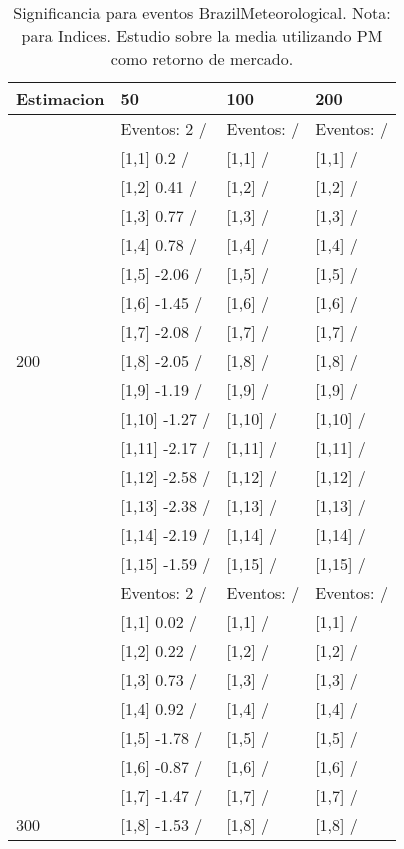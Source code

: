 \begin{table}

\caption{Significancia para eventos BrazilMeteorological. Nota: para Indices. Estudio sobre la media utilizando PM como retorno de mercado.}
\centering
\begin{tabular}[t]{llll}
\toprule
Estimacion & 50 & 100 & 200\\
\midrule
 & Eventos:  2 / & Eventos:   / & Eventos:   /\\
 & {}[1,1] 0.2  / & {}[1,1]  / & {}[1,1]  /\\
 & {}[1,2] 0.41  / & {}[1,2]  / & {}[1,2]  /\\
 & {}[1,3] 0.77  / & {}[1,3]  / & {}[1,3]  /\\
 & {}[1,4] 0.78  / & {}[1,4]  / & {}[1,4]  /\\
\addlinespace
 & {}[1,5] -2.06  / & {}[1,5]  / & {}[1,5]  /\\
 & {}[1,6] -1.45  / & {}[1,6]  / & {}[1,6]  /\\
 & {}[1,7] -2.08  / & {}[1,7]  / & {}[1,7]  /\\
200 & {}[1,8] -2.05  / & {}[1,8]  / & {}[1,8]  /\\
 & {}[1,9] -1.19  / & {}[1,9]  / & {}[1,9]  /\\
\addlinespace
 & {}[1,10] -1.27  / & {}[1,10]  / & {}[1,10]  /\\
 & {}[1,11] -2.17  / & {}[1,11]  / & {}[1,11]  /\\
 & {}[1,12] -2.58  / & {}[1,12]  / & {}[1,12]  /\\
 & {}[1,13] -2.38  / & {}[1,13]  / & {}[1,13]  /\\
 & {}[1,14] -2.19  / & {}[1,14]  / & {}[1,14]  /\\
\addlinespace
 & {}[1,15] -1.59  / & {}[1,15]  / & {}[1,15]  /\\
 & Eventos:  2 / & Eventos:   / & Eventos:   /\\
 & {}[1,1] 0.02  / & {}[1,1]  / & {}[1,1]  /\\
 & {}[1,2] 0.22  / & {}[1,2]  / & {}[1,2]  /\\
 & {}[1,3] 0.73  / & {}[1,3]  / & {}[1,3]  /\\
\addlinespace
 & {}[1,4] 0.92  / & {}[1,4]  / & {}[1,4]  /\\
 & {}[1,5] -1.78  / & {}[1,5]  / & {}[1,5]  /\\
 & {}[1,6] -0.87  / & {}[1,6]  / & {}[1,6]  /\\
 & {}[1,7] -1.47  / & {}[1,7]  / & {}[1,7]  /\\
300 & {}[1,8] -1.53  / & {}[1,8]  / & {}[1,8]  /\\

\end{tabular}
\end{table}
